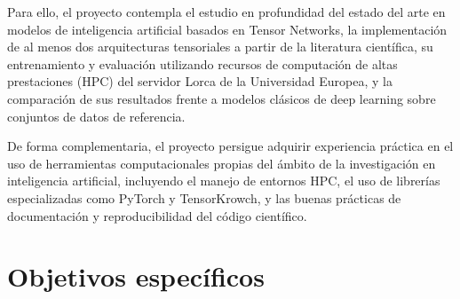 \documentclass[11pt,a4paper]{report}
\begin{document}
Para ello, el proyecto contempla el estudio en profundidad del estado del arte en modelos de inteligencia artificial basados en Tensor Networks, la implementación de al menos dos arquitecturas tensoriales a partir de la literatura científica, su entrenamiento y evaluación utilizando recursos de computación de altas prestaciones (HPC) del servidor Lorca de la Universidad Europea, y la comparación de sus resultados frente a modelos clásicos de deep learning sobre conjuntos de datos de referencia.

De forma complementaria, el proyecto persigue adquirir experiencia práctica en el uso de herramientas computacionales propias del ámbito de la investigación en inteligencia artificial, incluyendo el manejo de entornos HPC, el uso de librerías especializadas como PyTorch y TensorKrowch, y las buenas prácticas de documentación y reproducibilidad del código científico.

\section{Objetivos espec\'ificos}
\end{document}
